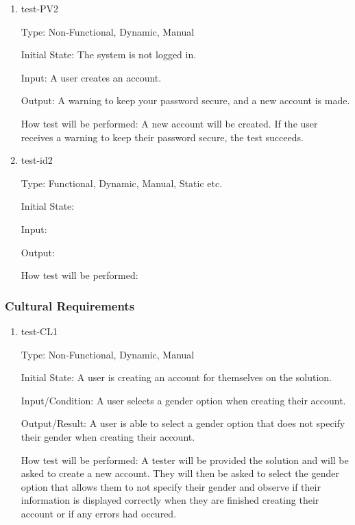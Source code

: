 \documentclass[12pt, titlepage]{article}
\begin{document}
\begin{enumerate}
  \item{test-PV2\\}

  Type: Non-Functional, Dynamic, Manual

  Initial State: The system is not logged in.

  Input: A user creates an account.

  Output: A warning to keep your password secure, and a new account is made.

  How test will be performed: A new account will be created. If the user 
  receives a warning to keep their password secure, the test succeeds.

  \item{test-id2\\}
  
  Type: Functional, Dynamic, Manual, Static etc.
            
  Initial State: 
            
  Input: 
            
  Output: 
            
  How test will be performed: 
  
\end{enumerate}

\subsubsection{Cultural Requirements}

\begin{enumerate}

  \item{test-CL1\\}
  
  Type: Non-Functional, Dynamic, Manual
            
  Initial State: A user is creating an account for themselves on the solution.
            
  Input/Condition: A user selects a gender option when creating their account.
            
  Output/Result: A user is able to select a gender option that does not specify their
  gender when creating their account.
            
  How test will be performed: A tester will be provided the solution and will be asked
  to create a new account. They will then be asked to select the gender option that allows
  them to not specify their gender and observe if their information is displayed correctly
  when they are finished creating their account or if any errors had occured.
  
\end{enumerate}
\end{document}
